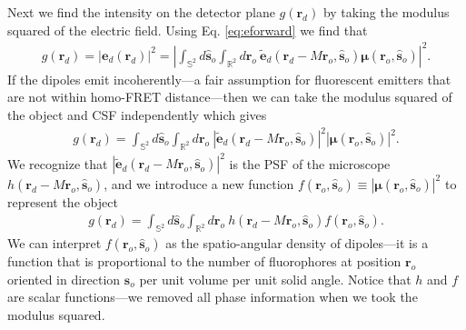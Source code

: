 \documentclass[11pt]{article}
\providecommand{\mb}[1]{\mathbf{#1}}
\providecommand{\ro}[1]{\mathbf{\mathbf{r}}_o}
\providecommand{\so}[1]{\mathbf{\hat{s}}_o}
\providecommand{\rd}[1]{\mathbf{r}_d}
\providecommand{\bs}[1]{\boldsymbol{#1}}
\begin{document}
Next we find the intensity on the detector plane $g(\rd{})$ by taking the
modulus squared of the electric field. Using Eq. \ref{eq:eforward} we find that
\begin{align}
  g(\rd{}) = |\mb{e}_d(\rd{})|^2 = \left|\int_{\mathbb{S}^2}d\so{}\int_{\mathbb{R}^2}d\ro{} \ \tilde{\mb{e}}_d(\rd{} - M\mb{r}_o, \so{})\bs{\mu}(\ro{}, \so{})\right|^2. 
\end{align}
If the dipoles emit incoherently---a fair assumption for fluorescent emitters
that are not within homo-FRET distance---then we can take the modulus squared of the
object and CSF independently which gives
\begin{align}
  g(\rd{}) = \int_{\mathbb{S}^2}d\so{}\int_{\mathbb{R}^2}d\ro{} \ \left|\tilde{\mb{e}}_d(\rd{} - M\mb{r}_o, \so{})\right|^2\left|\bs{\mu}(\ro{}, \so{})\right|^2. 
\end{align}
We recognize that $\left|\tilde{\mb{e}}_d(\rd{} - M\mb{r}_o, \so{})\right|^2$ is
the PSF of the microscope $h(\rd{} - M\mb{r}_o, \so{})$, and
we introduce a new function
$f(\ro{}, \so{}) \equiv \left|\bs{\mu}(\ro{}, \so{})\right|^2$ to represent the object
\begin{align}
  g(\rd{}) = \int_{\mathbb{S}^2}d\so{}\int_{\mathbb{R}^2}d\ro{} \ h(\rd{} - M\mb{r}_o, \so{})f(\ro{}, \so{}).\label{eq:forwardint}
\end{align}
We can interpret $f(\ro{}, \so{})$ as the spatio-angular density of dipoles---it
is a function that is proportional to the number of fluorophores at position
$\ro{}$ oriented in direction $\so{}$ per unit volume per unit solid angle. Notice
that $h$ and $f$ are scalar functions---we removed all phase information when we took
the modulus squared. 
\end{document}
